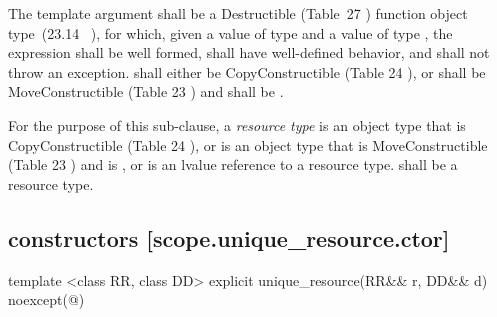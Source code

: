\documentclass[ebook,11pt,article]{memoir}
\begin{document}
\pnum 
The template argument
 shall be a 
Destructible 
(Table~27
) function object type~(23.14~
), 
for which, given
a value  of type  and a value
 of type , the expression
 shall be well formed, shall have well-defined behavior, and shall not throw an exception.
 shall either be CopyConstructible (Table 24
), or 
 shall be MoveConstructible (Table 23
) and
 shall be .

\pnum
For the purpose of this sub-clause, 
a \emph{resource type}  is an object type that is
CopyConstructible (Table 24
),  or 
is an object type that is MoveConstructible (Table 23
) and
 is ,
or is an lvalue reference to a resource type.
 shall be a resource type.
 

\newpage
\subsection { constructors [scope.unique_resource.ctor]}


\begin{itemdecl}
template <class RR, class DD>
explicit 
unique_resource(RR&& r, DD&& d) noexcept(@\seebelow@)
\end{itemdecl}
\end{document}
